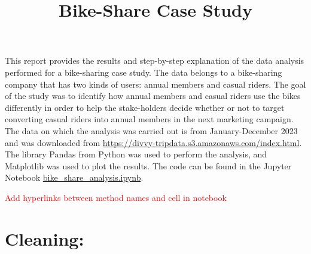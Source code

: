 \documentclass[12pt]{article}
\begin{document}
\title{Bike-Share Case Study}
\date{}
\maketitle

This report provides the results and step-by-step explanation of the data analysis performed for a bike-sharing case study. The data belongs to a bike-sharing company that has two kinds of users: annual members and casual riders. The goal of the study was to identify how annual members and casual riders use the bikes differently in order to help the stake-holders decide whether or not to target converting casual riders into annual members in the next marketing campaign. The data on which the analysis was carried out is from January-December 2023 and was downloaded from \url{https://divvy-tripdata.s3.amazonaws.com/index.html}. \\

The library Pandas from Python was used to perform the analysis, and Matplotlib was used to plot the results. The code can be found in the Jupyter Notebook \href{https://github.com/SummerKassem/BikeShareCS/blob/main/Code/bike_share_analysis.ipynb}{bike\_share\_analysis.ipynb}.

\textcolor{red}{Add hyperlinks between method names and cell in notebook}


\section*{Cleaning:}
\end{document}
